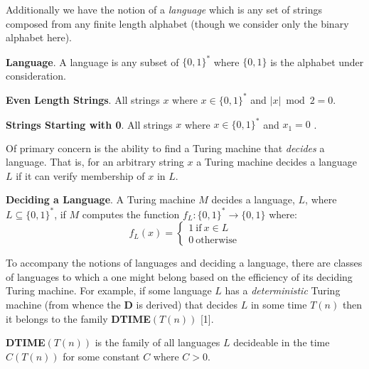 \documentclass[usletter]{article}
\begin{document}
Additionally we have the notion of a \textit{language} which is any set of strings composed from any finite length alphabet (though we consider only the binary alphabet here).

\begin{definition}
  \textbf{Language}. A language is any subset of $\{0, 1\}^*$ where $\{0, 1\}$ is the alphabet under consideration.
\end{definition}

\begin{example}
  \textbf{Even Length Strings}. All strings $x$ where $x \in \{0, 1\}^*$ and $|x| \bmod 2 = 0$.
\end{example}

\begin{example}
  \textbf{Strings Starting with 0}. All strings $x$ where $x \in \{0, 1\}^*$ and $x_1 = 0$ .
\end{example}

Of primary concern is the ability to find a Turing machine that \textit{decides} a language. That is, for an arbitrary string $x$ a Turing machine decides a language $L$ if it can verify membership of $x$ in $L$.

\begin{definition}
  \textbf{Deciding a Language}. A Turing machine $M$ decides a language, $L$,  where $ L \subseteq \{0,1\}^*$, if $M$ computes the function $f_L : \{0, 1\}^* \rightarrow \{0,1\}$ where:
  \begin{equation*}
    f_L(x) =
    \begin{cases}
      1\ \text{if}\ x \in L \\
      0\ \text{otherwise}
    \end{cases}
  \end{equation*}
\end{definition}

To accompany the notions of languages and deciding a language, there are classes of languages to which a one might belong based on the efficiency of its deciding Turing machine. For example, if some language $L$ has a \textit{deterministic} Turing machine (from whence the \textbf{D} is derived) that decides $L$ in some time $T(n)$ then it belongs to the family \textbf{DTIME}$(T(n))$ [1].

\begin{definition}
  \textbf{DTIME}$(T(n))$ is the family of all languages $L$ decideable in the time $C(T(n))$ for some constant $C$ where $C > 0$.
\end{definition}
\end{document}
